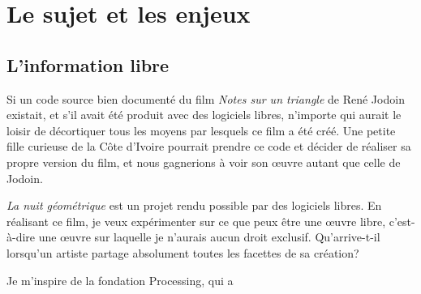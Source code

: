 \section{Le sujet et les enjeux}


\subsection{L'information libre}



Si un code source bien documenté du film \textit{Notes sur un triangle} de René Jodoin existait, et s'il avait été produit avec des logiciels libres, n'importe qui aurait le loisir de décortiquer tous les moyens par lesquels ce film a été créé. Une petite fille curieuse de la Côte d'Ivoire pourrait prendre ce code et décider de réaliser sa propre version du film, et nous gagnerions à voir son \oe{}uvre autant que celle de Jodoin.



\textit{La nuit géométrique} est un projet rendu possible par des logiciels libres. En réalisant ce film, je veux expérimenter sur ce que peux être une \oe{}uvre libre, c'est-à-dire une \oe{}uvre sur laquelle je n'aurais aucun droit exclusif. Qu'arrive-t-il lorsqu'un artiste partage absolument toutes les facettes de sa création?

Je m'inspire de la fondation Processing, qui a 





